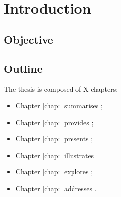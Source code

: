 \chapter{Introduction}
\label{chap:intro}



\lipsum[1]




\section{Objective}
\label{sec:objective}

\lipsum[1]




\section{Outline}
\label{sec:outline}


The thesis is composed of X chapters:
\begin{itemize}
	\item Chapter \ref{chap:} summarises ;
	
	\item Chapter \ref{chap:} provides ;
	
	\item Chapter \ref{chap:} presents ;
		
	\item Chapter \ref{chap:} illustrates ;

	\item Chapter \ref{chap:} explores ;	
	
	\item Chapter \ref{chap:} addresses .
\end{itemize}





